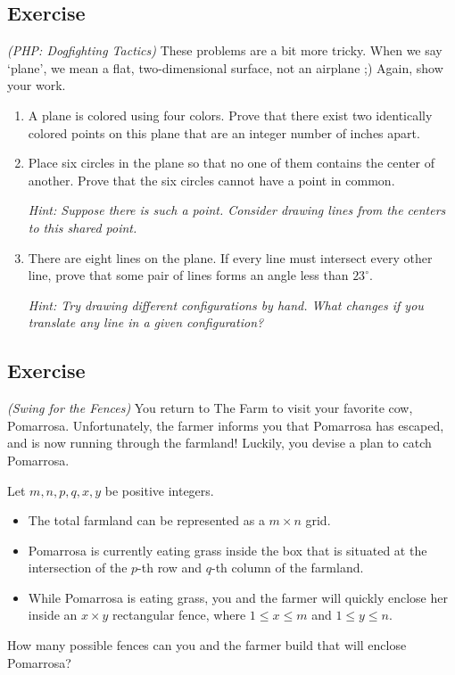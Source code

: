 \documentclass{article}
\newcounter{counter}
\newcommand{\Exercise}{Exercise \stepcounter{counter}\thecounter}
\begin{document}
\subsection*{\Exercise}
    \textit{(PHP: Dogfighting Tactics) } These problems are a bit more tricky. When we say `plane', we mean a flat, two-dimensional surface, not an airplane ;) Again, show your work.
    \begin{enumerate}
        \item A plane is colored using four colors. Prove that there exist two identically colored points on this plane that are an integer number of inches apart.
        \item Place six circles in the plane so that no one of them contains the center of another. Prove that the six circles cannot have a point in common.
        
        \vspace{1mm} \textit{Hint: Suppose there is such a point. Consider drawing lines from the centers to this shared point.}
        \item There are eight lines on the plane. If every line must intersect every other line, prove that some pair of lines forms an angle less than $23^{\circ}$.
        
        \vspace{1mm} \textit{Hint: Try drawing different configurations by hand. What changes if you translate any line in a given configuration?}
    \end{enumerate}

\subsection*{\Exercise}
    \textit{(Swing for the Fences) } You return to The Farm to visit your favorite cow, Pomarrosa. Unfortunately, the farmer informs you that Pomarrosa has escaped, and is now running through the farmland! Luckily, you devise a plan to catch Pomarrosa. 
    
    \vspace{1.5mm}
    Let $m, n, p, q, x, y$ be positive integers. 
    \begin{itemize}
        \item The total farmland can be represented as a $m \times n$ grid.
        \item Pomarrosa is currently eating grass inside the box that is situated at the intersection of the $p$-th row and $q$-th column of the farmland.
        \item While Pomarrosa is eating grass, you and the farmer will quickly enclose her inside an $x \times y$ rectangular fence, where $1 \le x \le m$ and $1 \le y \le n$.
    \end{itemize}
    How many possible fences can you and the farmer build that will enclose Pomarrosa?
\end{document}
